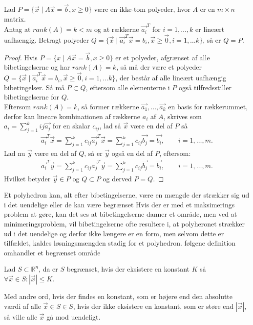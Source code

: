 \begin{stn} 
Lad $P=\{\vec{x}\mid A\vec{x}=\vec{b},x\geq 0\}$ være en ikke-tom polyeder, hvor $A$ er en $m\times n$ matrix.\\
Antag at $rank(A)=k<m$ og at rækkerne $\vec{a_i}^T$ for $i=1,\dots ,k$ er lineært uafhængig. Betragt polyeder $Q=\{\vec{x}\mid \vec{a_i}^T\vec{x}=b_{i}, \vec{x}\geq \vec{0}, i = 1,\dots	k\}$, så er $Q=P$.
\label{stn:PQ}
\end{stn}
\begin{proof}
Hvis $P=\{x\mid A\vec{x}=\vec{b},x\geq 0\}$ er et polyeder, afgrænset af alle bibetingelserne og har $rank(A)=k$, så må der være et polyeder $Q=\{\vec{x}\mid \vec{a_i}^T\vec{x}=b_{i}, \vec{x}\geq \vec{0}, i = 1,\dots	k\}$, der består af alle lineært uafhængig bibetingelser. Så må $P\subset Q$, eftersom alle elementerne i $P$ også tilfredsstiller bibetingelserne for $Q$.\\
Eftersom $rank(A)=k$, så former rækkerne $\vec{a_1},\dots ,\vec{a_k}$ en basis for rækkerummet, derfor kan lineare kombinationen af rækkerne $a_i$ af $A$, skrives som $a_i=\sum_{j=1}^{k}{i j}\vec{a_j}$ for en skalar $c_{i j}$, lad så $\vec{x}$ være en del af $P$ så
\begin{align*}
\vec{a_i}^T\vec{x}=\sum_{j=1}^{k}c_{i j}\vec{a_j}^T\vec{x}=\sum_{j=1}^{k}c_{i j}\vec{b_j}=\vec{b_i}, \qquad i=1,\dots,m.
\end{align*}
Lad nu $\vec{y}$ være en del af $Q$, så er $\vec{y}$ også en del af $P$, eftersom:
\begin{align*}
\vec{a_i}^T\vec{y}=\sum_{j=1}^{k}c_{i j}\vec{a_j}^T\vec{y}=\sum_{j=1}^{k}c_{i j}\vec{b_j}=\vec{b_i}, \qquad i=1,\dots,m.
\end{align*}
Hvilket betyder $\vec{y}\in P$ og $Q\subset P$ og derved $P=Q$.
\end{proof}
Et polyhedron kan, alt efter bibetingelserne, være en mængde der strækker sig ud i det uendelige eller de kan være begrænset 
Hvis der er med et maksimerings problem at gøre, kan det ses at bibetingelserne danner et område, men ved at minimeringsproblem, vil bibetingelserne ofte resultere i, at polyheronet strækker ud i det uendelige og derfor ikke længere er en form, men selvom dette er tilfældet, kaldes løsningsmængden stadig for et polyhedron.
følgene definition omhandler et begrænset område
\begin{defn} [Begrænset]
Lad $S \subset \mathds{R}^n$, da er $S$ begrænset, hvis der eksistere en konstant $K$ så $\forall \vec{x} \in S: |\vec{x}| \leq K$.
\end{defn}
Med andre ord, hvis der findes en konstant, som er højere end den absolutte værdi af alle $\vec{x} \in S \in S$, hvis der ikke eksistere en konstant, som er støre end $|\vec{x}|$, så ville alle $\vec{x}$ gå mod uendeligt.